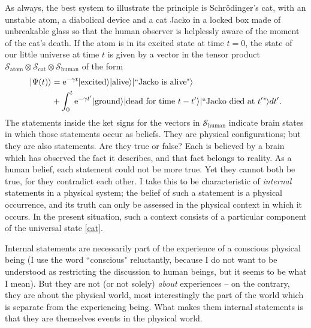 \documentclass[12pt,a4paper,reqno]{article}
\renewcommand{\(}{\left(}
\renewcommand{\)}{\right)}
\newcommand{\e}{\mbox{e}}
\renewcommand{\S}{\mathcal{S}}
\newcommand{\ox}{\otimes}
\newcommand{\<}{\langle}
\renewcommand{\>}{\rangle}
\theoremstyle{plain} %
\theoremstyle{definition}
\theoremstyle{remark}
\begin{document}
As always, the best system to illustrate the principle is
Schr\"odinger's cat, with an unstable atom, a diabolical device and a
cat Jacko in a locked box made of unbreakable glass so that the human observer
is helplessly aware of the moment of the cat's death. If the atom is in
its excited state at time $t=0$, the state of our little universe at
time $t$ is given by a vector in the tensor product
$\S_{\text{atom}}\ox\S_{\text{cat}}\ox\S_{\text{human}}$ of the form
\begin{align}\label{cat}
|\Psi(t)\> &= \e^{-\gamma t}
|\text{excited}\>|\text{alive}\>|\text{``Jacko is alive"}\>\notag\\
&+\int_0^t \e^{-\gamma t^\prime}|\text{ground}\>|\text{dead for time }t-t^\prime\>
|\text{``Jacko died at }t^\prime\text{"}\>dt^\prime.
\end{align}
The statements inside the ket signs for the vectors in $\S_{\text{human}}$
indicate brain states in which those statements occur as beliefs. They
are physical configurations; but they are also statements. Are they true
or false? Each is believed by a brain which has observed the fact it
describes, and that fact belongs to reality. As a
human belief, each statement could not be more true. Yet they cannot both
be true, for they contradict each other. I take this to be
characteristic of \emph{internal} statements in a physical system; the
belief of such a statement is a physical occurrence, and its truth can
only be assessed in the physical context in which it occurs. In the
present situation, such a context consists of a particular component of
the universal state \eqref{cat}. 

Internal statements are necessarily part of the experience of a conscious
physical being (I use the word ``conscious" reluctantly, 
because I do not want to be understood as restricting the discussion to
human beings, but it seems to be what I mean). But they are not (or not
solely) \emph{about} experiences -- on
the contrary, they are about the physical world, most interestingly the
part of the world which is separate from the experiencing being. What
makes them internal statements is that they are themselves events in the
physical world. 
\end{document}
